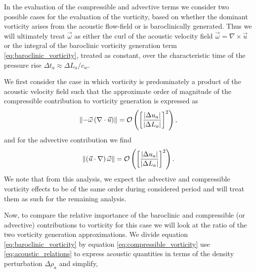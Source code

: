 In the evaluation of the compressible and advective terms we consider
two possible cases for the evaluation of the vorticity, based on
whether the dominant vorticity arises from the acoustic flow-field or
is baroclinically generated. Thus we will ultimately treat
$\vec{\omega}$ as either the curl of the acoustic velocity field
$\vec{\omega}=\nabla\times\vec{u}$ or the integral of the baroclinic
vorticity generation term \eqref{eq:baroclinic_vorticity}, treated as
constant, over the characteristic time of the pressure rise
$\Delta t_a\approx\Delta L_a/c_w$.

We first consider the case in which vorticity is predominately a
product of the acoustic velocity field such that the approximate order
of magnitude of the compressible contribution to vorticity generation
is expressed as
\begin{align}
  \label{eq:compressible_vorticity}%
  \norm{-\vec{\omega}\left(\nabla\cdot\vec{u}\right)} = \orderof{\left[\frac{\abs{\Delta u_a}}{\abs{\Delta L_a}}\right]^2},%
\end{align}
and for the advective contribution we find
\begin{align}
  \label{eq:advective_vorticity}%
  \norm{\left(\vec{u}\cdot\nabla\right)\vec{\omega}} = \orderof{\left[\frac{\abs{\Delta u_a}}{\abs{\Delta L_a}}\right]^2}.%
\end{align}
We note that from this analysis, we expect the advective and
compressible vorticity effects to be of the same order during
considered period and will treat them as such for the remaining
analysis.

Now, to compare the relative importance of the baroclinic and
compressible (or advective) contributions to vorticity for this case
we will look at the ratio of the two vorticity generation
approximations. We divide equation \eqref{eq:baroclinic_vorticity} by
equation \eqref{eq:compressible_vorticity} use
\eqref{eq:acoustic_relations} to express acoustic quantities in terms
of the density perturbation $\Delta \rho_a$ and simplify,

